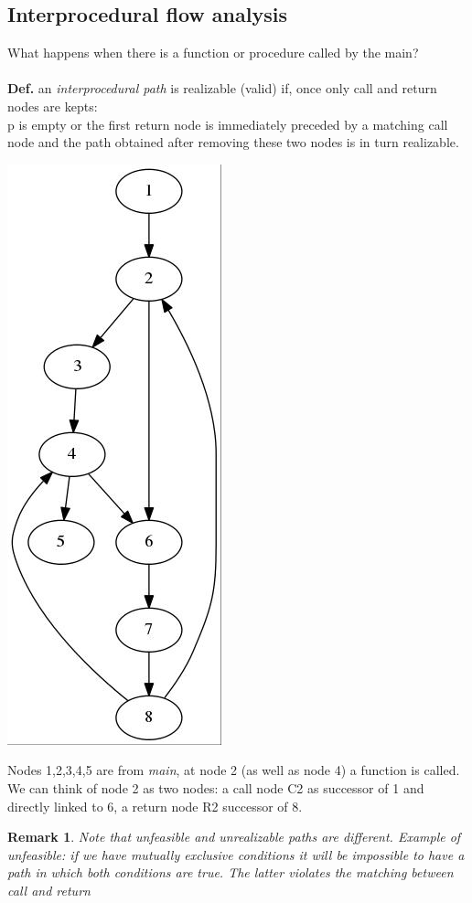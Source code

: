 \documentclass[10pt,a4paper]{article}
\newtheorem{remark}{Remark}
\begin{document}
\subsection{Interprocedural flow analysis}
What happens when there is a function or procedure called by the main?\\\\
\textbf{Def.} an \emph{interprocedural path} is realizable (valid) if, once only call and return nodes are kepts:\\
p is empty or the first return node is immediately preceded by a matching call node and the path obtained after removing these two nodes is in turn realizable.\\
\begin{center}
\includegraphics[scale=0.4]{img/interprocedural.jpg}
\end{center}
Nodes 1,2,3,4,5 are from \emph{main}, at node 2 (as well as node 4) a function is called. We can think of node 2 as two nodes: a call node C2 as successor of 1 and directly linked to 6, a return node R2 successor of 8.
\begin{remark}
Note that unfeasible and unrealizable paths are different.
Example of unfeasible: if we have mutually exclusive conditions it will be impossible to have a path in which both conditions are true.
The latter violates the matching between call and return
\end{remark}
\newpage
\end{document}
